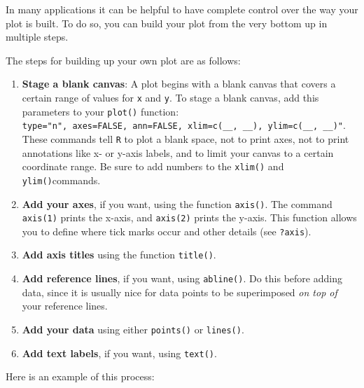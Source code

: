 \documentclass[
]{book}
\begin{document}
In many applications it can be helpful to have complete control over the way your plot is built. To do so, you can build your plot from the very bottom up in multiple steps.

The steps for building up your own plot are as follows:

\begin{enumerate}
\def\labelenumi{\arabic{enumi}.}
\item
  \textbf{Stage a blank canvas}: A plot begins with a blank canvas that covers a certain range of values for \texttt{x} and \texttt{y}. To stage a blank canvas, add this parameters to your \texttt{plot()} function: \texttt{type="n",\ axes=FALSE,\ ann=FALSE,\ xlim=c(\_\_,\ \_\_),\ ylim=c(\_\_,\ \_\_)"}. These commands tell \texttt{R} to plot a blank space, not to print axes, not to print annotations like x- or y-axis labels, and to limit your canvas to a certain coordinate range. Be sure to add numbers to the \texttt{xlim()} and \texttt{ylim()}commands.
\item
  \textbf{Add your axes}, if you want, using the function \texttt{axis()}. The command \texttt{axis(1)} prints the x-axis, and \texttt{axis(2)} prints the y-axis. This function allows you to define where tick marks occur and other details (see \texttt{?axis}).
\item
  \textbf{Add axis titles} using the function \texttt{title()}.
\item
  \textbf{Add reference lines}, if you want, using \texttt{abline()}. Do this before adding data, since it is usually nice for data points to be superimposed \emph{on top of} your reference lines.
\item
  \textbf{Add your data} using either \texttt{points()} or \texttt{lines()}.
\item
  \textbf{Add text labels}, if you want, using \texttt{text()}.
\end{enumerate}

Here is an example of this process:
\end{document}

